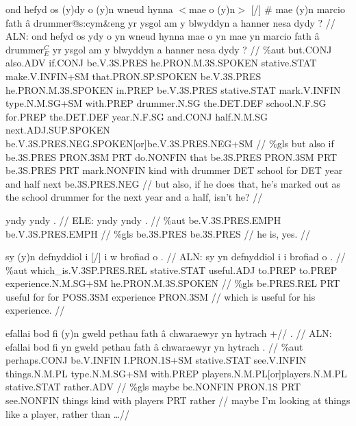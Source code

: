 \documentclass[a4paper,10pt]{article}
\begin{document}
\ex
\begingl[lingstyle=gergl]
\glchat ond hefyd os (y)dy o (y)n wneud hynna $<$mae o (y)n$>$ [/] \# mae (y)n marcio fath â drummer@s:cym\&eng yr ysgol am y blwyddyn a hanner nesa dydy ? //
\glsurface ALN:  ond hefyd os ydy o yn wneud hynna mae o yn mae yn marcio fath â drummer$^{C}_{E}$ yr ysgol am y blwyddyn a hanner nesa dydy ?  //
\glauto \%aut  but{\scriptsize .CONJ} also{\scriptsize .ADV} if{\scriptsize .CONJ} be{\scriptsize .V.3S.PRES} he{\scriptsize .PRON.M.3S.SPOKEN} stative{\scriptsize .STAT} make{\scriptsize .V.INFIN+SM} that{\scriptsize .PRON.SP.SPOKEN} be{\scriptsize .V.3S.PRES} he{\scriptsize .PRON.M.3S.SPOKEN} in{\scriptsize .PREP} be{\scriptsize .V.3S.PRES} stative{\scriptsize .STAT} mark{\scriptsize .V.INFIN} type{\scriptsize .N.M.SG+SM} with{\scriptsize .PREP} drummer{\scriptsize .N.SG} the{\scriptsize .DET.DEF} school{\scriptsize .N.F.SG} for{\scriptsize .PREP} the{\scriptsize .DET.DEF} year{\scriptsize .N.F.SG} and{\scriptsize .CONJ} half{\scriptsize .N.M.SG} next{\scriptsize .ADJ.SUP.SPOKEN} be{\scriptsize .V.3S.PRES.NEG.SPOKEN[or]be.V.3S.PRES.NEG+SM}   //
\glmanual \%gls  but also if be{\scriptsize .3S.PRES} PRON{\scriptsize .3SM} PRT do{\scriptsize .NONFIN} that be{\scriptsize .3S.PRES} PRON{\scriptsize .3SM} PRT be{\scriptsize .3S.PRES} PRT mark{\scriptsize .NONFIN} kind with drummer DET school for DET year and half next be{\scriptsize .3S.PRES.NEG}   //
\gleng but also, if he does that, he's marked out as the school drummer for the next year and a half, isn't he? //
\endgl
\xe

\ex
\begingl[lingstyle=gergl]
\glchat yndy yndy . //
\glsurface ELE:  yndy yndy .  //
\glauto \%aut  be{\scriptsize .V.3S.PRES.EMPH} be{\scriptsize .V.3S.PRES.EMPH}   //
\glmanual \%gls  be{\scriptsize .3S.PRES} be{\scriptsize .3S.PRES}   //
\gleng he is, yes. //
\endgl
\xe

\ex
\begingl[lingstyle=gergl]
\glchat sy (y)n defnyddiol i [/] i w brofiad o . //
\glsurface ALN:  sy yn defnyddiol i i brofiad o .  //
\glauto \%aut  which\_is{\scriptsize .V.3SP.PRES.REL} stative{\scriptsize .STAT} useful{\scriptsize .ADJ} to{\scriptsize .PREP} to{\scriptsize .PREP} experience{\scriptsize .N.M.SG+SM} he{\scriptsize .PRON.M.3S.SPOKEN}   //
\glmanual \%gls  be{\scriptsize .PRES.REL} PRT useful for for POSS{\scriptsize .3SM} experience PRON{\scriptsize .3SM}  //
\gleng which is useful for his experience. //
\endgl
\xe

\ex
\begingl[lingstyle=gergl]
\glchat efallai bod fi (y)n gweld pethau fath â chwaraewyr yn hytrach +// . //
\glsurface ALN:  efallai bod fi yn gweld pethau fath â chwaraewyr yn hytrach .  //
\glauto \%aut  perhaps{\scriptsize .CONJ} be{\scriptsize .V.INFIN} I{\scriptsize .PRON.1S+SM} stative{\scriptsize .STAT} see{\scriptsize .V.INFIN} things{\scriptsize .N.M.PL} type{\scriptsize .N.M.SG+SM} with{\scriptsize .PREP} players{\scriptsize .N.M.PL[or]players.N.M.PL} stative{\scriptsize .STAT} rather{\scriptsize .ADV}   //
\glmanual \%gls  maybe be{\scriptsize .NONFIN} PRON{\scriptsize .1S} PRT see{\scriptsize .NONFIN} things kind with players PRT rather   //
\gleng maybe I'm looking at things like a player, rather than \dots  //
\endgl
\xe
\end{document}
